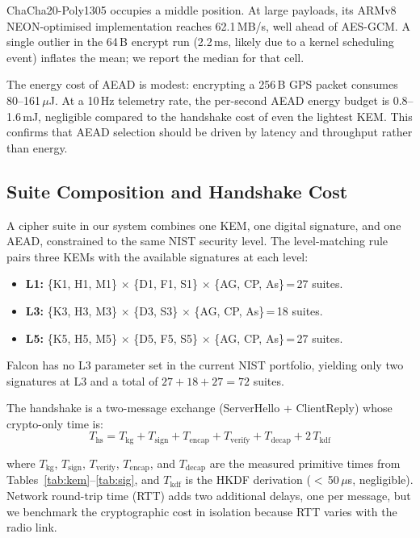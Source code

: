 \documentclass[conference]{IEEEtran}
\begin{document}
ChaCha20-Poly1305 occupies a middle position.  At large payloads, its
ARMv8 NEON-optimised implementation reaches 62.1\,MB/s, well ahead of
AES-GCM.  A single outlier in the 64\,B encrypt run (2.2\,ms, likely
due to a kernel scheduling event) inflates the mean; we report the
median for that cell.

The energy cost of AEAD is modest: encrypting a 256\,B GPS packet
consumes 80--161\,$\mu$J.  At a 10\,Hz telemetry rate, the per-second
AEAD energy budget is 0.8--1.6\,mJ, negligible compared to the
handshake cost of even the lightest KEM.  This confirms that AEAD
selection should be driven by latency and throughput rather than energy.


\subsection{Suite Composition and Handshake Cost}
\label{sec:suites}

A cipher suite in our system combines one KEM, one digital signature,
and one AEAD, constrained to the same NIST security level.  The
level-matching rule pairs three KEMs with the available signatures
at each level:

\begin{itemize}
  \item \textbf{L1:} \{K1, H1, M1\} $\times$ \{D1, F1, S1\} $\times$
    \{AG, CP, As\}\,=\,27 suites.
  \item \textbf{L3:} \{K3, H3, M3\} $\times$ \{D3, S3\} $\times$
    \{AG, CP, As\}\,=\,18 suites.
  \item \textbf{L5:} \{K5, H5, M5\} $\times$ \{D5, F5, S5\} $\times$
    \{AG, CP, As\}\,=\,27 suites.
\end{itemize}

Falcon has no L3 parameter set in the current NIST portfolio, yielding
only two signatures at L3 and a total of $27 + 18 + 27 = 72$ suites.

The handshake is a two-message exchange (ServerHello + ClientReply)
whose crypto-only time is:
\begin{equation}
\label{eq:handshake}
T_{\text{hs}} = T_{\text{kg}} + T_{\text{sign}} + T_{\text{encap}}
              + T_{\text{verify}} + T_{\text{decap}} + 2\,T_{\text{kdf}}
\end{equation}

\noindent
where $T_{\text{kg}}$, $T_{\text{sign}}$, $T_{\text{verify}}$,
$T_{\text{encap}}$, and $T_{\text{decap}}$ are the measured primitive
times from Tables~\ref{tab:kem}--\ref{tab:sig}, and $T_{\text{kdf}}$
is the HKDF derivation ($<$\,50\,$\mu$s, negligible).
Network round-trip time (RTT) adds two additional delays, one per
message, but we benchmark the cryptographic cost in isolation
because RTT varies with the radio link.
\end{document}
